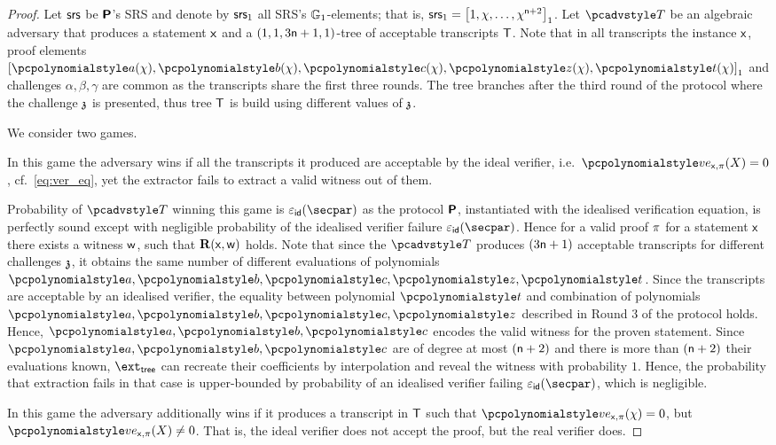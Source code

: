 \iffalse
\begin{proof}
	Let $\mathsf{srs}$ be $\bm{\mathsf{P}}$'s SRS and denote by $\mathsf{srs}_1$ all SRS's
	$\mathbb{G}_1$-elements; that is,
	$\mathsf{srs}_1 = \left[1, \chi, \ldots, \chi^{\mathsf{n} + 2}\right]_{1}$. Let $\tdv$ be an
	algebraic adversary that produces a statement $\mathsf{x}$ and a
	$(1, 1, 3\mathsf{n} + 1, 1)$-tree of acceptable transcripts $\mathsf{T}$.  Note that in
	all transcripts the instance $\mathsf{x}$, proof elements
	$\gone{\p{a}(\chi), \p{b}(\chi), \p{c}(\chi), \p{z}(\chi), \p{t}(\chi)}$ and
	challenges $\alpha, \beta, \gamma$ are common as the transcripts share the
	first three rounds. The tree branches after the third round of the protocol
	where the challenge $\mathfrak{z}$ is presented, thus tree $\mathsf{T}$ is build using
	different values of $\mathfrak{z}$.
	
	We consider two games.
	
	 In this game the adversary wins if all the transcripts it
	produced are acceptable by the ideal verifier,
	i.e.~$\vereq_{\inp, \zkproof}(X) = 0$, cf.~\cref{eq:ver_eq}, yet the extractor
	fails to extract a valid witness out of them.
	
	Probability of $\tdv$ winning this game is $\epsid(\secpar)$ as the protocol
	$\bm{\mathsf{P}}$, instantiated with the idealised verification equation, is
	perfectly sound except with negligible probability of the idealised verifier
	failure $\epsid(\secpar)$. Hence for a valid proof $\pi$ for a statement
	$\mathsf{x}$ there exists a witness $\mathsf{w}$, such that $\mathbf{R}(\mathsf{x}, \mathsf{w})$ holds. Note
	that since the $\tdv$ produces $(3 \mathsf{n} + 1)$ acceptable transcripts for
	different challenges $\mathfrak{z}$, it obtains the same number of different
	evaluations of polynomials $\p{a}, \p{b}, \p{c}, \p{z}, \p{t}$. Since the
	transcripts are acceptable by an idealised verifier, the equality between
	polynomial $\p{t}$ and combination of polynomials $\p{a}, \p{b}, \p{c}, \p{z}$
	described in Round 3 of the protocol holds. Hence, $\p{a}, \p{b}, \p{c}$
	encodes the valid witness for the proven statement. Since
	$\p{a}, \p{b}, \p{c}$ are of degree at most $(\mathsf{n} + 2)$ and there is more
	than $(\mathsf{n} + 2)$ their evaluations known, $\extt$ can recreate their
	coefficients by interpolation and reveal the witness with probability
	$1$. Hence, the probability that extraction fails in that case is
	upper-bounded by probability of an idealised verifier failing
	$\epsid(\secpar)$, which is negligible.
	
	 In this game the adversary additionally wins if it produces a
	transcript in $\mathsf{T}$ such that $\vereq_{\inp, \zkproof}(\chi) = 0$, but
	$\vereq_{\inp, \zkproof}(X) \neq 0$. That is, the ideal verifier does not
	accept the proof, but the real verifier does.
	

\end{proof}
